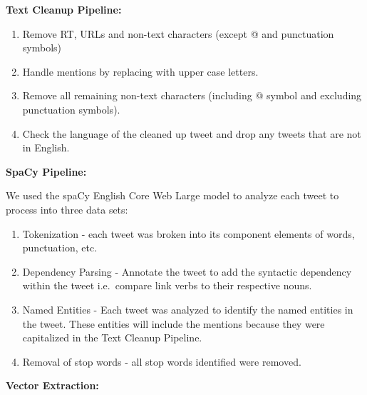 \documentclass[12pt,oneside]{chicagocapstone}
\begin{document}
\textbf{Text Cleanup Pipeline:}
\begin{enumerate}
\def\labelenumi{\arabic{enumi}.}
\item
  Remove RT, URLs and non-text characters (except @ and punctuation
  symbols)
\item
  Handle mentions by replacing with upper case letters.
\item
  Remove all remaining non-text characters (including @ symbol and
  excluding punctuation symbols).
\item
  Check the language of the cleaned up tweet and drop any tweets that
  are not in English.
\end{enumerate}
\textbf{SpaCy Pipeline:}

We used the spaCy English Core Web Large model to analyze each tweet to
process into three data sets:
\begin{enumerate}
\def\labelenumi{\arabic{enumi}.}
\item
  Tokenization - each tweet was broken into its component elements of
  words, punctuation, etc.
\item
  Dependency Parsing - Annotate the tweet to add the syntactic
  dependency within the tweet i.e.~compare link verbs to their
  respective nouns.
\item
  Named Entities - Each tweet was analyzed to identify the named
  entities in the tweet. These entities will include the mentions
  because they were capitalized in the Text Cleanup Pipeline.
\item
  Removal of stop words - all stop words identified were removed.
\end{enumerate}
\textbf{Vector Extraction:}
\end{document}
